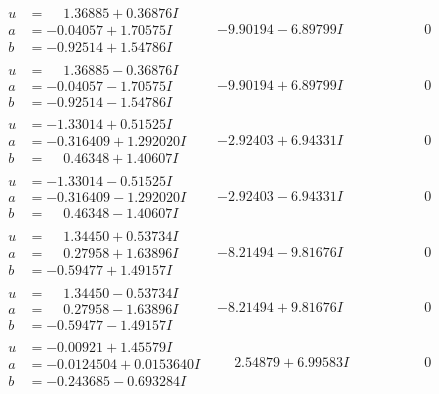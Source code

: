 \documentclass[1p]{elsarticle_modified}
\theoremstyle{definition}
\begin{document}
$$\begin{array}{c|c|c}
\begin{aligned}
u &= \phantom{-}1.36885 + 0.36876 I \\
a &= -0.04057 + 1.70575 I \\
b &= -0.92514 + 1.54786 I\end{aligned}
 & -9.90194 - 6.89799 I & \phantom{-0.000000 } 0 \\ \hline\begin{aligned}
u &= \phantom{-}1.36885 - 0.36876 I \\
a &= -0.04057 - 1.70575 I \\
b &= -0.92514 - 1.54786 I\end{aligned}
 & -9.90194 + 6.89799 I & \phantom{-0.000000 } 0 \\ \hline\begin{aligned}
u &= -1.33014 + 0.51525 I \\
a &= -0.316409 + 1.292020 I \\
b &= \phantom{-}0.46348 + 1.40607 I\end{aligned}
 & -2.92403 + 6.94331 I & \phantom{-0.000000 } 0 \\ \hline\begin{aligned}
u &= -1.33014 - 0.51525 I \\
a &= -0.316409 - 1.292020 I \\
b &= \phantom{-}0.46348 - 1.40607 I\end{aligned}
 & -2.92403 - 6.94331 I & \phantom{-0.000000 } 0 \\ \hline\begin{aligned}
u &= \phantom{-}1.34450 + 0.53734 I \\
a &= \phantom{-}0.27958 + 1.63896 I \\
b &= -0.59477 + 1.49157 I\end{aligned}
 & -8.21494 - 9.81676 I & \phantom{-0.000000 } 0 \\ \hline\begin{aligned}
u &= \phantom{-}1.34450 - 0.53734 I \\
a &= \phantom{-}0.27958 - 1.63896 I \\
b &= -0.59477 - 1.49157 I\end{aligned}
 & -8.21494 + 9.81676 I & \phantom{-0.000000 } 0 \\ \hline\begin{aligned}
u &= -0.00921 + 1.45579 I \\
a &= -0.0124504 + 0.0153640 I \\
b &= -0.243685 - 0.693284 I\end{aligned}
 & \phantom{-}2.54879 + 6.99583 I & \phantom{-0.000000 } 0\\

\end{array}$$
\end{document}
